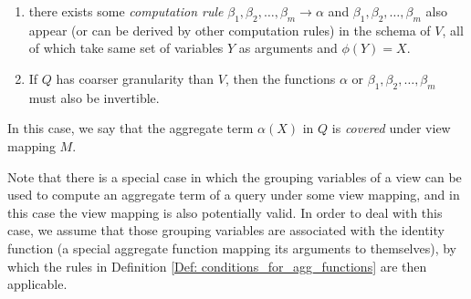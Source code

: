 \begin{definition}
\begin{enumerate}
\item there exists some {\em computation rule} $\beta_1, \beta_2, \dots, \beta_m \rightarrow \alpha$ and $\beta_1, \beta_2, \dots, \beta_m$ also appear (or can be derived by other computation rules) in the schema of $V$, all of which take same set of variables $Y$ as arguments and $\phi(Y) = X$.
\item If $Q$ has coarser granularity than $V$, then the functions $\alpha$ or $\beta_1, \beta_2, \dots, \beta_m$ must also be invertible.
\end{enumerate}
In this case, we say that the aggregate term $\alpha(X)$ in $Q$ is {\em covered} under view mapping $M$.
\end{definition}

Note that there is a special case in which the grouping variables of a view can be used to compute an aggregate term of a query under some view mapping, and in this case the view mapping is also potentially valid. In order to deal with this case, we assume that those grouping variables are associated with the  identity  function (a special aggregate function mapping its arguments to themselves), by which the rules in Definition \ref{Def: conditions_for_agg_functions} are then applicable.


